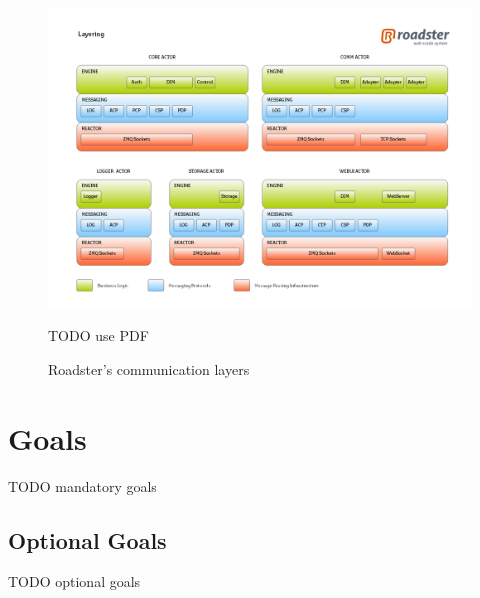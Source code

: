 \begin{figure}[!ht]
	\includegraphics[trim=2cm 2.5cm 1cm 2.8cm, clip=true, width=\textwidth]{img/roadster_layering.png}
	\caption{Roadster's communication layers}
	\label{fig:roadster:layers}
TODO use PDF
\end{figure}

\section{Goals}
TODO mandatory goals

\subsection*{Optional Goals}
TODO optional goals
